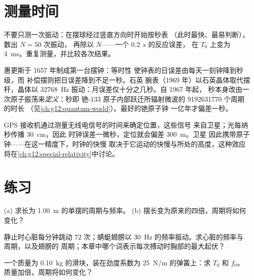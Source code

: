 \section{测量时间}

\begin{method}[周期的测定]\label{met:g12:oscillators-and-time:timing}
不要只测一次振动：在摆球经过竖直方向时开始按秒表
（此时最快、最易判断），数出 $N = 50$ 次振动，
再除以 $N$——一个 \qty{0.2}{s} 的反应误差，
在 $T_0$ 上变为 \qty{4}{ms}。重复测量，并比较各次结果。
\end{method}

\begin{example}[三个世纪的滴答]\label{ex:g12:oscillators-and-time:clocks}
惠更斯于 \num{1657} 年制成第一台摆钟：等时性
使钟表的日误差由每天一刻钟降到秒级，而
补偿摆则把日误差降到不足一秒。石英
腕表（\num{1969} 年）以石英晶体取代摆杆，晶体以
\qty{32768}{Hz} 振动：月误差仅十分之几秒。自 \num{1967} 年起，
秒本身改由一次原子振荡来\emph{定义}：秒即
铯-133 原子内部跃迁所辐射微波的 \num{9192631770} 个周期的时长
（见\cref{ch:g12:quantum-world}）。最好的铯原子钟
一亿年才偏差一秒。
\end{example}

\begin{remark}[为何追求纳秒精度]\label{rem:g12:oscillators-and-time:gps}
GPS 接收机通过测量无线电信号的时间来确定位置，这些信号
来自卫星；光每纳秒传播 \qty{30}{cm}，因此
时钟误差一微秒，定位就会偏差 \qty{300}{m}。卫星
因此携带原子钟——在这一精度下，时钟的快慢
取决于它运动的快慢与所处的高度，这种效应
将在\cref{ch:g12:special-relativity}中讨论。
\end{remark}

\section{练习}

\begin{exercise}[$\star$]\label{exo:g12:oscillators-and-time:1}
(a) 求长为 \qty{1.00}{m} 的单摆的周期与频率。
(b) 摆长变为原来的四倍，周期将如何变化？
\end{exercise}

\begin{exercise}[$\star$]\label{exo:g12:oscillators-and-time:2}
静止时心脏每分钟跳动 $72$ 次；蜻蜓翅膀以
\qty{30}{Hz} 的频率振动。求心脏的频率与周期，以及翅膀的
周期；本章中哪个词表示每次搏动时胸部的最大起伏？
\end{exercise}

\begin{exercise}[$\star$]\label{exo:g12:oscillators-and-time:3}
一个质量为 \qty{0.10}{kg} 的滑块，装在劲度系数为 \qty{25}{N/m} 的弹簧上：求 $T_0$
和 $f_0$。质量加倍，周期将如何变化？
\end{exercise}

